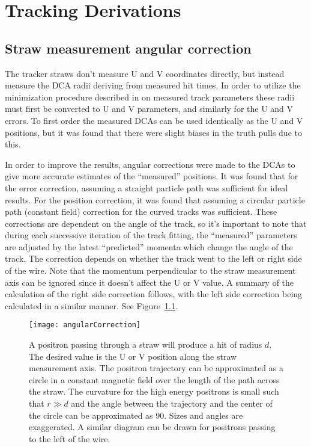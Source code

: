 
\thispagestyle{myheadings}

\graphicspath{{Body/Figures/TrackingFigures/CoordSys/}}

\chapter{Tracking Derivations}

\section{Straw measurement angular correction}
\label{app:angularcorrection}


The tracker straws don't measure U and V coordinates directly, but instead measure the DCA radii deriving from measured hit times. In order to utilize the minimization procedure described in  on measured track parameters these radii must first be converted to U and V parameters, and similarly for the U and V errors. To first order the measured DCAs can be used identically as the U and V positions, but it was found that there were slight biases in the truth pulls due to this.

In order to improve the results, angular corrections were made to the DCAs to give more accurate estimates of the ``measured'' positions. It was found that for the error correction, assuming a straight particle path was sufficient for ideal results. For the position correction, it was found that assuming a circular particle path (constant field) correction for the curved tracks was sufficient. These corrections are dependent on the angle of the track, so it's important to note that during each successive iteration of the track fitting, the ``measured'' parameters are adjusted by the latest ``predicted'' momenta which change the angle of the track. The correction depends on whether the track went to the left or right side of the wire. Note that the momentum perpendicular to the straw measurement axis can be ignored since it doesn't affect the U or V value. A summary of the calculation of the right side correction follows, with the left side correction being calculated in a similar manner. See Figure~\ref{fig:angularCorrection}. 

\begin{figure}
	\centering
	\texttt{[image: angularCorrection]}
	\caption[Angular correction for measured DCAs]{A positron passing through a straw will produce a hit of radius $d$. The desired value is the U or V position along the straw measurement axis. The positron trajectory can be approximated as a circle in a constant magnetic field over the length of the path across the straw. The curvature for the high energy positrons is small such that $r \gg d$ and the angle between the trajectory and the center of the circle can be approximated as 90\textdegree{}. Sizes and angles are exaggerated. A similar diagram can be drawn for positrons passing to the left of the wire.}
	\label{fig:angularCorrection}
\end{figure}


